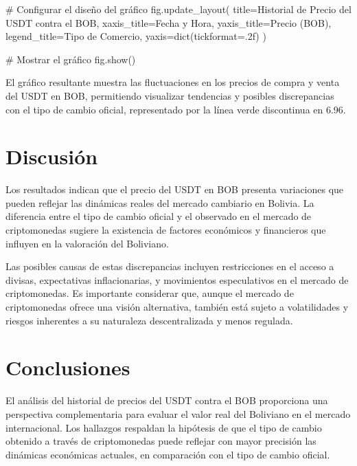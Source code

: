 \documentclass[
  letterpaper,
  DIV=11,
  numbers=noendperiod]{scrartcl}
\newenvironment{Shaded}{\begin{snugshade}}{\end{snugshade}}
\newcommand{\BuiltInTok}[1]{\textcolor[rgb]{0.00,0.23,0.31}{#1}}
\newcommand{\CommentTok}[1]{\textcolor[rgb]{0.37,0.37,0.37}{#1}}
\newcommand{\NormalTok}[1]{\textcolor[rgb]{0.00,0.23,0.31}{#1}}
\newcommand{\OperatorTok}[1]{\textcolor[rgb]{0.37,0.37,0.37}{#1}}
\newcommand{\StringTok}[1]{\textcolor[rgb]{0.13,0.47,0.30}{#1}}
\begin{document}
\begin{Shaded}
\begin{Highlighting}[]
\CommentTok{\# Configurar el diseño del gráfico}
\NormalTok{fig.update\_layout(}
\NormalTok{    title}\OperatorTok{=}\StringTok{\textquotesingle{}Historial de Precio del USDT contra el BOB\textquotesingle{}}\NormalTok{,}
\NormalTok{    xaxis\_title}\OperatorTok{=}\StringTok{\textquotesingle{}Fecha y Hora\textquotesingle{}}\NormalTok{,}
\NormalTok{    yaxis\_title}\OperatorTok{=}\StringTok{\textquotesingle{}Precio (BOB)\textquotesingle{}}\NormalTok{,}
\NormalTok{    legend\_title}\OperatorTok{=}\StringTok{\textquotesingle{}Tipo de Comercio\textquotesingle{}}\NormalTok{,}
\NormalTok{    yaxis}\OperatorTok{=}\BuiltInTok{dict}\NormalTok{(tickformat}\OperatorTok{=}\StringTok{\textquotesingle{}.2f\textquotesingle{}}\NormalTok{)}
\NormalTok{)}

\CommentTok{\# Mostrar el gráfico}
\NormalTok{fig.show()}
\end{Highlighting}
\end{Shaded}

El gráfico resultante muestra las fluctuaciones en los precios de compra
y venta del USDT en BOB, permitiendo visualizar tendencias y posibles
discrepancias con el tipo de cambio oficial, representado por la línea
verde discontinua en 6.96.

\section{Discusión}\label{discusiuxf3n}

Los resultados indican que el precio del USDT en BOB presenta
variaciones que pueden reflejar las dinámicas reales del mercado
cambiario en Bolivia. La diferencia entre el tipo de cambio oficial y el
observado en el mercado de criptomonedas sugiere la existencia de
factores económicos y financieros que influyen en la valoración del
Boliviano.

Las posibles causas de estas discrepancias incluyen restricciones en el
acceso a divisas, expectativas inflacionarias, y movimientos
especulativos en el mercado de criptomonedas. Es importante considerar
que, aunque el mercado de criptomonedas ofrece una visión alternativa,
también está sujeto a volatilidades y riesgos inherentes a su naturaleza
descentralizada y menos regulada.

\section{Conclusiones}\label{conclusiones}

El análisis del historial de precios del USDT contra el BOB proporciona
una perspectiva complementaria para evaluar el valor real del Boliviano
en el mercado internacional. Los hallazgos respaldan la hipótesis de que
el tipo de cambio obtenido a través de criptomonedas puede reflejar con
mayor precisión las dinámicas económicas actuales, en comparación con el
tipo de cambio oficial.
\end{document}
